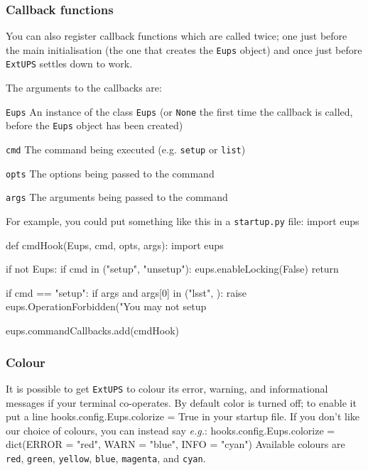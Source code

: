 \documentclass{article}
\newcommand{\code}[1]{\texttt{#1}}
\newcommand{\file}[1]{\texttt{#1}}
\newcommand{\eups}{\code{ExtUPS}\xspace}
\let\overbatim=\verbatim
\let\oendverbatim=\endverbatim
\renewenvironment{verbatim}
{\center\minipage{16cm}\overbatim}
{\oendverbatim\endminipage\endcenter}
\begin{document}
\subsubsection{Callback functions}
\label{commandCallbacks}

You can also register callback functions which are called twice; one just before the main initialisation (the
one that creates the \code{Eups} object) and once just before \eups settles down to work.

The arguments to the callbacks are:
\begin{description}
  \item \code{Eups}
    An instance of the class \code{Eups} (or \code{None} the first time the callback is called, before
    the \code{Eups} object has been created)

  \item \code{cmd}
    The command being executed (e.g. \code{setup} or \code{list})

  \item \code{opts}
    The options being passed to the command

  \item \code{args}
    The arguments being passed to the command
\end{description}

For example, you could put something like this in a \file{startup.py} file:
\begin{verbatim}
import eups

def cmdHook(Eups, cmd, opts, args):
    import eups

    if not Eups:
        if cmd in ("setup", "unsetup"):
            eups.enableLocking(False)
        return

    if cmd == "setup":
        if args and args[0] in ("lsst", ):
            raise eups.OperationForbidden("You may not setup %s because I say so" % args[0])

eups.commandCallbacks.add(cmdHook)
\end{verbatim}

\subsubsection{Colour}
\label{color}

It is possible to get \eups to colour its error, warning, and informational messages if your
terminal co-operates.  By default color is turned off; to enable it put a line
\begin{verbatim}
hooks.config.Eups.colorize = True
\end{verbatim}
in your startup file.  If you don't like our choice of colours, you can instead say \textit{e.g.}:
\begin{verbatim}
hooks.config.Eups.colorize = dict(ERROR = "red", WARN = "blue", INFO = "cyan")
\end{verbatim}
Available colours are \code{red}, \code{green}, \code{yellow}, \code{blue}, \code{magenta}, and \code{cyan}.
\end{document}
